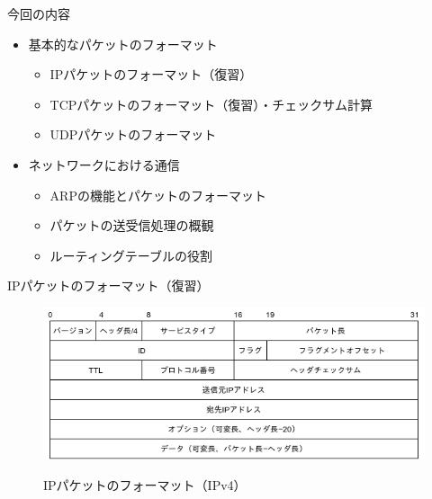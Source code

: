 \documentclass[12pt,aspectratio=169]{beamer}
\begin{document}
\begin{frame}{今回の内容}

  \begin{itemize}
    \item 基本的なパケットのフォーマット
      \begin{itemize}
        \item IPパケットのフォーマット（復習）
        \item TCPパケットのフォーマット（復習）・チェックサム計算
        \item UDPパケットのフォーマット
      \end{itemize}
    \item ネットワークにおける通信
      \begin{itemize}
        \item ARPの機能とパケットのフォーマット
        \item パケットの送受信処理の概観
        \item ルーティングテーブルの役割
      \end{itemize}

  \end{itemize}

\end{frame}


\begin{frame}{IPパケットのフォーマット（復習）}

  \centering
  \begin{figure}
    \centering
    \includegraphics[width=12cm,bb=0 0 581 232]{./figures/ip_packet.png}
    \label{fig:ip_packet}
    \caption{IPパケットのフォーマット（IPv4）}
  \end{figure}

\end{frame}
\end{document}
